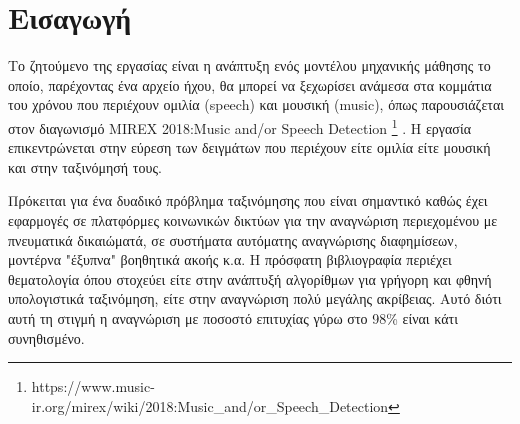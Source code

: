 \section{Εισαγωγή}

Το ζητούμενο της εργασίας είναι η ανάπτυξη ενός μοντέλου μηχανικής
μάθησης το οποίο, παρέχοντας ένα αρχείο ήχου, θα μπορεί να ξεχωρίσει
ανάμεσα στα κομμάτια του χρόνου που περιέχουν ομιλία (speech) και
μουσική (music), όπως παρουσιάζεται στον διαγωνισμό MIREX 2018:Music and/or Speech Detection 
\footnote{https://www.music-ir.org/mirex/wiki/2018:Music\_and/or\_Speech\_Detection} .
Η εργασία επικεντρώνεται στην εύρεση των δειγμάτων που περιέχουν είτε ομιλία είτε μουσική
και στην ταξινόμησή τους.

Πρόκειται για ένα δυαδικό πρόβλημα ταξινόμησης που είναι σημαντικό καθώς έχει
εφαρμογές σε πλατφόρμες κοινωνικών δικτύων για την αναγνώριση
περιεχομένου με πνευματικά δικαιώματά, σε συστήματα αυτόματης
αναγνώρισης διαφημίσεων, μοντέρνα "έξυπνα" βοηθητικά ακοής κ.α. Η
πρόσφατη βιβλιογραφία περιέχει θεματολογία όπου στοχεύει είτε στην
ανάπτυξή αλγορίθμων για γρήγορη και φθηνή υπολογιστικά ταξινόμηση,
είτε στην αναγνώριση πολύ μεγάλης ακρίβειας. Αυτό διότι αυτή τη
στιγμή η αναγνώριση με ποσοστό επιτυχίας γύρω στο 98\% είναι κάτι
συνηθισμένο.